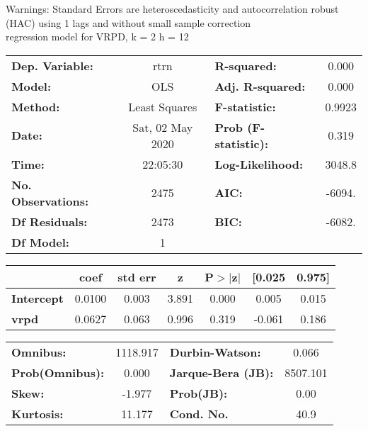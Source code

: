 Warnings: \newline
 [1] Standard Errors are heteroscedasticity and autocorrelation robust (HAC) using 1 lags and without small sample correction\\ 

regression model for VRPD, k = 2 h = 12\begin{center}
\begin{tabular}{lclc}
\toprule
\textbf{Dep. Variable:}    &       rtrn       & \textbf{  R-squared:         } &     0.000   \\
\textbf{Model:}            &       OLS        & \textbf{  Adj. R-squared:    } &     0.000   \\
\textbf{Method:}           &  Least Squares   & \textbf{  F-statistic:       } &    0.9923   \\
\textbf{Date:}             & Sat, 02 May 2020 & \textbf{  Prob (F-statistic):} &    0.319    \\
\textbf{Time:}             &     22:05:30     & \textbf{  Log-Likelihood:    } &    3048.8   \\
\textbf{No. Observations:} &        2475      & \textbf{  AIC:               } &    -6094.   \\
\textbf{Df Residuals:}     &        2473      & \textbf{  BIC:               } &    -6082.   \\
\textbf{Df Model:}         &           1      & \textbf{                     } &             \\
\bottomrule
\end{tabular}
\begin{tabular}{lcccccc}
                   & \textbf{coef} & \textbf{std err} & \textbf{z} & \textbf{P$> |$z$|$} & \textbf{[0.025} & \textbf{0.975]}  \\
\midrule
\textbf{Intercept} &       0.0100  &        0.003     &     3.891  &         0.000        &        0.005    &        0.015     \\
\textbf{vrpd}      &       0.0627  &        0.063     &     0.996  &         0.319        &       -0.061    &        0.186     \\
\bottomrule
\end{tabular}
\begin{tabular}{lclc}
\textbf{Omnibus:}       & 1118.917 & \textbf{  Durbin-Watson:     } &    0.066  \\
\textbf{Prob(Omnibus):} &   0.000  & \textbf{  Jarque-Bera (JB):  } & 8507.101  \\
\textbf{Skew:}          &  -1.977  & \textbf{  Prob(JB):          } &     0.00  \\
\textbf{Kurtosis:}      &  11.177  & \textbf{  Cond. No.          } &     40.9  \\
\bottomrule
\end{tabular}
\end{center}


